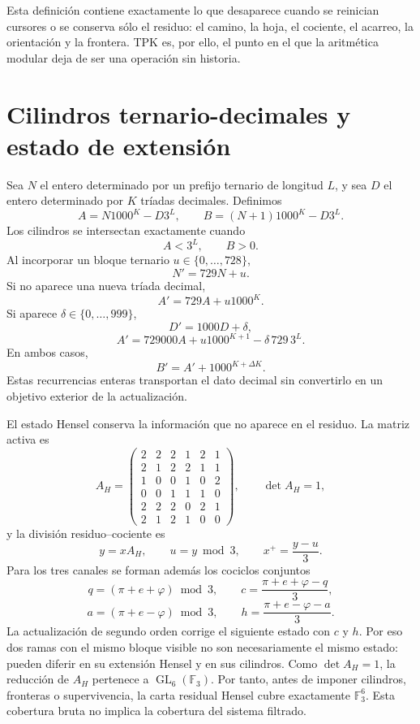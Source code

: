 Esta definici\'on contiene exactamente lo que desaparece cuando se reinician
cursores o se conserva s\'olo el residuo: el camino, la hoja, el cociente, el
acarreo, la orientaci\'on y la frontera. TPK es, por ello, el punto en el que
la aritm\'etica modular deja de ser una operaci\'on sin historia.

\section{Cilindros ternario-decimales y estado de extensión}

Sea \(N\) el entero determinado por un prefijo ternario de longitud \(L\), y
sea \(D\) el entero determinado por \(K\) tr\'iadas decimales. Definimos
\[
 A=N1000^K-D3^L,
 \qquad
 B=(N+1)1000^K-D3^L.
\]
Los cilindros se intersectan exactamente cuando
\[
 \boxed{A<3^L,\qquad B>0.}
\]
Al incorporar un bloque ternario \(u\in\{0,\ldots,728\}\),
\[
 N'=729N+u.
\]
Si no aparece una nueva tr\'iada decimal,
\[
 A'=729A+u1000^K.
\]
Si aparece \(\delta\in\{0,\ldots,999\}\),
\[
 D'=1000D+\delta,
\]
\[
 A'=729000A+u1000^{K+1}-\delta\,729\,3^L.
\]
En ambos casos,
\[
 B'=A'+1000^{K+\Delta K}.
\]
Estas recurrencias enteras transportan el dato decimal sin convertirlo en un
objetivo exterior de la actualizaci\'on.

El estado Hensel conserva la informaci\'on que no aparece en el residuo. La
matriz activa es
\[
A_H=\begin{pmatrix}
2&2&2&1&2&1\\2&1&2&2&1&1\\1&0&0&1&0&2\\
0&0&1&1&1&0\\2&2&2&0&2&1\\2&1&2&1&0&0
\end{pmatrix},\qquad \det A_H=1,
\]
y la divisi\'on residuo--cociente es
\[
 y=xA_H,\qquad u=y\bmod3,\qquad x^+=\frac{y-u}{3}.
\]
Para los tres canales se forman adem\'as los cociclos conjuntos
\[
 q=(\pi+e+\varphi)\bmod3,
 \qquad
 c=\frac{\pi+e+\varphi-q}{3},
\]
\[
 a=(\pi+e-\varphi)\bmod3,
 \qquad
 h=\frac{\pi+e-\varphi-a}{3}.
\]
La actualizaci\'on de segundo orden corrige el siguiente estado con \(c\) y
\(h\). Por eso dos ramas con el mismo bloque visible no son necesariamente el
mismo estado: pueden diferir en su extensi\'on Hensel y en sus cilindros.
Como \(\det A_H=1\), la reducci\'on de \(A_H\) pertenece a
\(\operatorname{GL}_6(\mathbb F_3)\). Por tanto, antes de imponer cilindros,
fronteras o supervivencia, la carta residual Hensel cubre exactamente
\(\mathbb F_3^6\). Esta cobertura bruta no implica la cobertura del sistema
filtrado.

